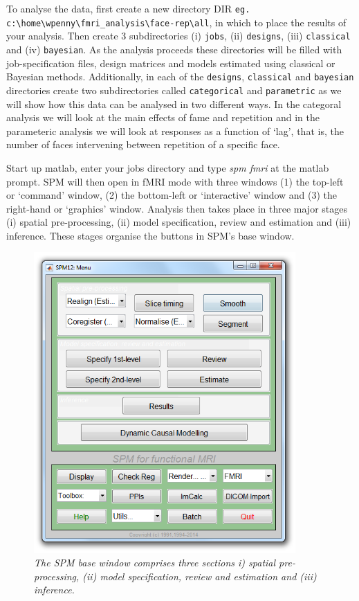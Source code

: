 \documentclass[a4paper,titlepage]{book}
\begin{document}
To analyse the data, first create a new directory DIR 
\newline \verb!eg. c:\home\wpenny\fmri_analysis\face-rep\all!, in which to place the results
of your analysis. Then create 3 subdirectories (i) \verb!jobs!, 
(ii) \verb!designs!, (iii) \verb!classical! and (iv) \verb!bayesian!. As the analysis 
proceeds these directories will be filled with job-specification files, design matrices 
and models estimated using classical or Bayesian 
methods. Additionally, in each of the \verb!designs!, \verb!classical! and \verb!bayesian! directories create 
two subdirectories called \verb!categorical! and 
\verb!parametric! as we will show how this data 
can be analysed in two different ways. 
In the categoral analysis we will look at the 
main effects of fame and repetition and in the 
parameteric analysis we will look at 
responses as a function of `lag', that is, the number of faces intervening between repetition of a specific face.

Start up matlab, enter your jobs directory and type {\em spm fmri} at the matlab prompt. SPM will then open in fMRI mode with three windows (1) the top-left or `command' window, (2) the 
bottom-left or `interactive' window
and (3) the right-hand or `graphics' window. 
Analysis 
then takes place in three major stages (i) 
spatial pre-processing, (ii) model specification, review 
and estimation and (iii) inference. These stages organise the buttons 
in SPM's base window.
\begin{figure}
\begin{center}
\includegraphics[width=100mm]{command}
\caption{\em The SPM base window comprises 
three sections i) 
spatial pre-processing, (ii) model specification, review 
and estimation and (iii) inference. \label{command}}
\end{center}
\end{figure}
\end{document}
